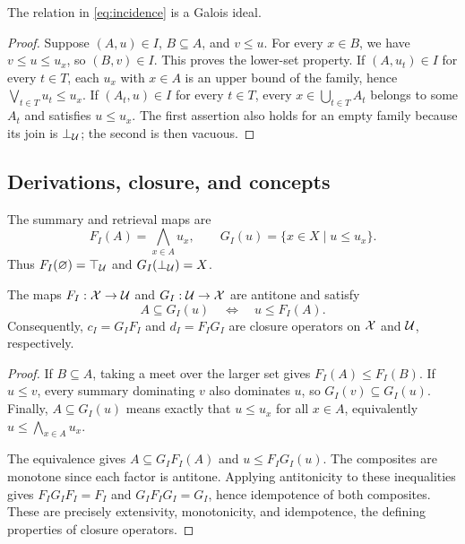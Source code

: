 \begin{proposition}
      \label{prop:galois-ideal}
      The relation in \cref{eq:incidence} is a Galois ideal.
\end{proposition}
\begin{proof}
      Suppose $(A,u)\in I$, $B\subseteq A$, and $v\leq u$. For every $x\in B$,
      we have $v\leq u\leq u_{x}$, so $(B,v)\in I$. This proves the lower-set
      property. If $(A,u_{t})\in I$ for every $t\in T$, each $u_{x}$ with
      $x\in A$ is an upper bound of the family, hence
      $\bigvee_{t\in T}u_{t}\leq u_{x}$. If $(A_{t},u)\in I$ for every
      $t\in T$, every $x\in\bigcup_{t\in T}A_{t}$ belongs to some $A_{t}$ and
      satisfies $u\leq u_{x}$. The first assertion also holds for an empty
      family because its join is $\bot_{\mathcal{U}}$; the second is then vacuous.
\end{proof}

\subsection{Derivations, closure, and concepts}
\label{sub:derivations}
The summary and retrieval maps are
\begin{equation}\label{eq:derivations}
      F_{I}(A)=\bigwedge_{x\in A}u_{x},\qquad
      G_{I}(u)=\{x\in X\mid u\leq u_{x}\}.
\end{equation}
Thus $F_{I}(\varnothing)=\top_{\mathcal{U}}$ and $G_{I}(\bot_{\mathcal{U}})=X$.

\begin{proposition}
      \label{prop:adjunction}
      The maps $F_{I}:\mathcal{X}\to\mathcal{U}$ and $G_{I}:\mathcal{U}\to\mathcal{X}$ are antitone and satisfy
      \begin{equation}\label{eq:adjunction}
            A\subseteq G_{I}(u)\quad\Longleftrightarrow\quad u\leq F_{I}(A).
      \end{equation}
      Consequently, $c_{I}=G_{I}F_{I}$ and $d_{I}=F_{I}G_{I}$ are closure
      operators on $\mathcal{X}$ and $\mathcal{U}$, respectively.
\end{proposition}
\begin{proof}
      If $B\subseteq A$, taking a meet over the larger set gives
      $F_{I}(A)\leq F_{I}(B)$. If $u\leq v$, every summary dominating $v$
      also dominates $u$, so $G_{I}(v)\subseteq G_{I}(u)$. Finally,
      $A\subseteq G_{I}(u)$ means exactly that $u\leq u_{x}$ for all
      $x\in A$, equivalently $u\leq\bigwedge_{x\in A}u_{x}$.

      The equivalence gives $A\subseteq G_{I}F_{I}(A)$ and
      $u\leq F_{I}G_{I}(u)$. The composites are monotone since each factor is
      antitone. Applying antitonicity to these inequalities gives
      $F_{I}G_{I}F_{I}=F_{I}$ and $G_{I}F_{I}G_{I}=G_{I}$, hence idempotence
      of both composites. These are precisely extensivity, monotonicity, and
      idempotence, the defining properties of closure operators.
\end{proof}

